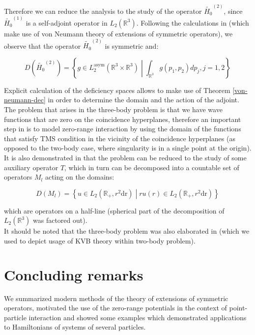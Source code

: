 \documentclass[11pt, a4paper, german]{article}
\theoremstyle{plain}
\theoremstyle{definition}
\theoremstyle{remark}
\numberwithin{equation}{section}
\numberwithin{theorem}{section}
\begin{document}
Therefore we can reduce the analysis to the study of the operator $\widetilde{H _{0} } ^{\left( 2 \right) } $, since $\widetilde{H _{0} } ^{\left( 1 \right) } $ is a self-adjoint operator in $L_2(\mathbb R^3)$. Following the calculations in \cite{B3} (which make use of von Neumann theory of extensions of symmetric operators), we observe that the operator $\widetilde{H _{0} } ^{\left( 2 \right)}$ is symmetric and:

\begin{equation}
D(\widetilde{H _{0} } ^{\left( 2 \right)}) = \left\{g \in L_2^{\text{asym}}(\mathbb R ^3 \times \mathbb R ^3 )\middle| \int _{\mathbb R ^3 }g (p_1, p_2) d p_j, j = 1,2\right\}
\end{equation}

Explicit calculation of the deficiency spaces allows to make use of Theorem \ref{von-neumann-dec} in order to determine the domain and the action of the adjoint. The problem that arises in the three-body problem is that we have wave functions that are zero on the coincidence hyperplanes, therefore an important step in \cite{B3} is to model zero-range interaction by using the domain of the functions that satisfy TMS condition in the vicinity of the coincidence hyperplanes (as opposed to the two-body case, where singularity is in a single point at the origin). It is also demonstrated in \cite{B3} that the problem can be reduced to the study of some auxiliary operator $T$, which in turn can be decomposed into a countable set of operators $M_l$ acting on the domains:

\begin{equation}
D(M_l) = \left\{u\in L_2(\mathbb R_+, r^2 \text{dr})\middle| r u(r) \in L_2(\mathbb R_+, r^2 \text{dr})\right\}
\end{equation}

which are operators on a half-line (spherical part of the decomposition of $L_2(\mathbb R^3)$ was factored out).\\

It should be noted that the three-body problem was also elaborated in \cite{A2} (which we used to depict usage of KVB theory within two-body problem).

\section{Concluding remarks}

We summarized modern methods of the theory of extensions of symmetric operators, motivated the use of the zero-range potentials in the context of point-particle interaction and showed some examples which demonstrated applications to Hamiltonians of systems of several particles.\\
\end{document}
